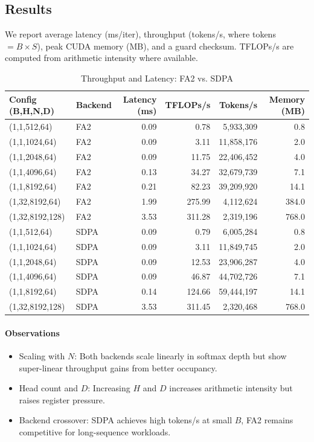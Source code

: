 \documentclass[11pt]{article}
\begin{document}
\subsection{Results}
We report average latency (ms/iter), throughput (tokens/s, where tokens $=B \times S$), peak CUDA memory (MB), and a guard checksum. TFLOPs/s are computed from arithmetic intensity where available.
\begin{table}[htbp]
\centering
\caption{Throughput and Latency: FA2 vs. SDPA}
\label{tab:fa2_sdpa_perf}
\begin{tabular}{@{}l l r r r r@{}}
\toprule
\textbf{Config (B,H,N,D)} & \textbf{Backend} & \textbf{Latency (ms)} & \textbf{TFLOPs/s} & \textbf{Tokens/s} & \textbf{Memory (MB)} \\
\midrule
(1,1,512,64) & FA2 & 0.09 & 0.78 & 5{,}933{,}309 & 0.8 \\
(1,1,1024,64) & FA2 & 0.09 & 3.11 & 11{,}858{,}176 & 2.0 \\
(1,1,2048,64) & FA2 & 0.09 & 11.75 & 22{,}406{,}452 & 4.0 \\
(1,1,4096,64) & FA2 & 0.13 & 34.27 & 32{,}679{,}739 & 7.1 \\
(1,1,8192,64) & FA2 & 0.21 & 82.23 & 39{,}209{,}920 & 14.1 \\
(1,32,8192,64) & FA2 & 1.99 & 275.99 & 4{,}112{,}624 & 384.0 \\
(1,32,8192,128) & FA2 & 3.53 & 311.28 & 2{,}319{,}196 & 768.0 \\
\midrule
(1,1,512,64) & SDPA & 0.09 & 0.79 & 6{,}005{,}284 & 0.8 \\
(1,1,1024,64) & SDPA & 0.09 & 3.11 & 11{,}849{,}745 & 2.0 \\
(1,1,2048,64) & SDPA & 0.09 & 12.53 & 23{,}906{,}287 & 4.0 \\
(1,1,4096,64) & SDPA & 0.09 & 46.87 & 44{,}702{,}726 & 7.1 \\
(1,1,8192,64) & SDPA & 0.14 & 124.66 & 59{,}444{,}197 & 14.1 \\
(1,32,8192,128) & SDPA & 3.53 & 311.45 & 2{,}320{,}468 & 768.0 \\
\bottomrule
\end{tabular}
\end{table}

\paragraph{Observations}
\begin{itemize}
\item Scaling with $N$: Both backends scale linearly in softmax depth but show super-linear throughput gains from better occupancy.
\item Head count and $D$: Increasing $H$ and $D$ increases arithmetic intensity but raises register pressure.
\item Backend crossover: SDPA achieves high tokens/s at small $B$, FA2 remains competitive for long-sequence workloads.
\end{itemize}
\end{document}
